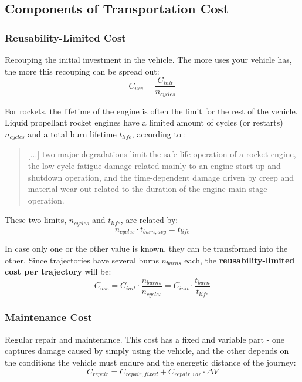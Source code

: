 \documentclass{article}
\begin{document}
\subsection{Components of Transportation Cost}
\subsubsection{Reusability-Limited Cost}
Recouping the initial investment in the vehicle. The more uses your vehicle has, the more this recouping can be spread out: 
\begin{equation}
C_{use} = \frac{C_{init}}{n_{cycles}}
\end{equation}

For rockets, the lifetime of the engine is often the limit for the rest of the vehicle. Liquid propellant rocket engines have a limited amount of cycles (or restarts) $n_{cycles}$ and a total burn lifetime $t_{life}$, according to \cite{source}:
\begin{quote}
[...] two major degradations limit the safe life operation of a rocket engine, the low-cycle fatigue damage related mainly to an engine start-up and shutdown operation, and the time-dependent damage driven by creep and material wear out related to the duration of the engine main stage operation.
\end{quote}

These two limits, $n_{cycles}$ and $t_{life}$, are related by:
\begin{equation}
n_{cycles} \cdot t_{burn, avg}= t_{life}
\end{equation}

In case only one or the other value is known, they can be transformed into the other. Since trajectories have several burns $n_{burns}$ each, the \textbf{reusability-limited cost per trajectory} will be:
\begin{equation}
C_{use} = C_{init} \cdot \frac{n_{burns}}{n_{cycles}}  = C_{init} \cdot \frac{t_{burn}}{t_{life}}
\end{equation}

\subsubsection{Maintenance Cost}
Regular repair and maintenance. This cost has a fixed and variable part - one captures damage caused by simply using the vehicle, and the other depends on the conditions the vehicle must endure and the energetic distance of the journey:
\begin{equation}
C_{repair} = C_{repair, fixed} + C_{repair, var} \cdot \Delta V
\end{equation}
\end{document}
